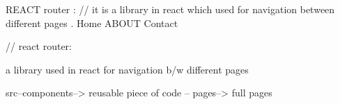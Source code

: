 REACT router :
// it is a library in react which used for navigation between different pages .
Home                          ABOUT                                 Contact


// react router:

a library used in react for navigation b/w different pages

src--components--> reusable piece of code
-- pages--> full pages
